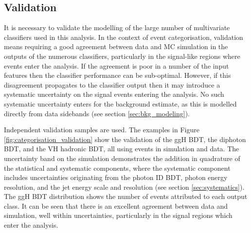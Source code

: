 \subsection{Validation}
It is necessary to validate the modelling of the large number of multivariate classifiers used in this analysis. In the context of event categorisation, validation means requiring a good agreement between data and MC simulation in the outputs of the numerous classifiers, particularly in the signal-like regions where events enter the analysis. If the agreement is poor in a number of the input features then the classifier performance can be sub-optimal. However, if this disagreement propagates to the classifier output then it may introduce a systematic uncertainty on the signal events entering the analysis. No such systematic uncertainty enters for the background estimate, as this is modelled directly from data sidebands (see section \ref{sec:bkg_modeling}).

Independent validation samples are used. The examples in Figure \ref{fig:categorisation_validation} show the validation of the ggH BDT, the diphoton BDT, and the VH hadronic BDT, all using \Zee events in simulation and data. The uncertainty band on the simulation demonstrates the addition in quadrature of the statistical and systematic components, where the systematic component includes uncertainties originating from the photon ID BDT, photon energy resolution, and the jet energy scale and resolution (see section \ref{sec:systematics}). The ggH BDT distribution shows the number of events attributed to each output class. It can be seen that there is an excellent agreement between data and simulation, well within uncertainties, particularly in the signal regions which enter the analysis.

